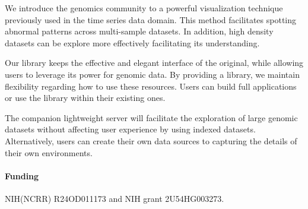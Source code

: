 \documentclass{bioinfo}
\begin{document}
We introduce the genomics community to a powerful visualization technique
previously used in the time series data domain. This method facilitates
spotting abnormal patterns across multi-sample datasets. In addition, high
density datasets can be explore more effectively facilitating its
understanding.

Our library keeps the effective and elegant interface of the original,
while allowing users to leverage its power for genomic data. By providing a
library, we maintain flexibility regarding how to use these resources. Users
can build full applications or use the library within their existing ones.

The companion lightweight server will facilitate the exploration of large
genomic datasets without affecting user experience by using indexed datasets.
Alternatively, users can create their own data sources to capturing the details
of their own environments.

\paragraph{Funding\textcolon} NIH(NCRR) R24OD011173 and NIH grant 2U54HG003273.


\end{document}
